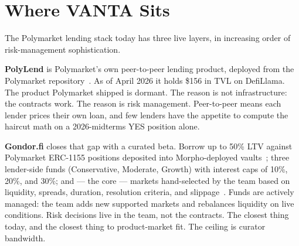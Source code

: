 \documentclass[11pt,letterpaper]{article}
\begin{document}
\begin{abstract}
We make four claims, in descending strength of evidence. First, the addressable market splits cleanly: a \emph{formalizable subset} of Polymarket (standard templates, whitelisted resolvers, $\geq 14$ days old) where curation reduces to gates plus bounded reasoning, and a \emph{hard subset} (novel templates, correlated baskets, custom resolvers) where human curation remains the correct tool. VANTA owns the formalizable subset; we explicitly defer the hard subset to lender-governance upgrades, not to the agent. Second, the resolution-aware haircut is a more honest pricing of tail risk than three buckets on the markets where its inputs are well-defined. Third, continuous agent reasoning --- not a periodic script over hard-coded gates --- is the correct shape for live risk: collateral prices, dispute behavior, and cluster correlations evolve between gate cycles, and the three loops respond to that evolution above the contract floor. Fourth, an attestation-liveness exit gives lenders a custody guarantee Gondor cannot offer: withdraw-only mode that activates without admin signatures if the enclave goes silent.

This paper specifies the engine, the onboarding rule set, the threat model, and the boundaries of the autonomy claim --- including the places where the framing overreaches and what we substitute instead.
\end{abstract}

\vspace{0.3cm}

\section{Where VANTA Sits}
\label{sec:ladder}

The Polymarket lending stack today has three live layers, in increasing order of risk-management sophistication.

\textbf{PolyLend} is Polymarket's own peer-to-peer lending product, deployed from the Polymarket repository~\cite{polylend}. As of April 2026 it holds \$156 in TVL on DefiLlama. The product Polymarket shipped is dormant. The reason is not infrastructure: the contracts work. The reason is risk management. Peer-to-peer means each lender prices their own loan, and few lenders have the appetite to compute the haircut math on a 2026-midterms YES position alone.

\textbf{Gondor.fi} closes that gap with a curated beta. Borrow up to 50\% LTV against Polymarket ERC-1155 positions deposited into Morpho-deployed vaults~\cite{morpho}; three lender-side funds (Conservative, Moderate, Growth) with interest caps of 10\%, 20\%, and 30\%; and --- the core --- markets hand-selected by the team based on liquidity, spreads, duration, resolution criteria, and slippage~\cite{gondor-docs}. Funds are actively managed: the team adds new supported markets and rebalances liquidity on live conditions. Risk decisions live in the team, not the contracts. The closest thing today, and the closest thing to product-market fit. The ceiling is curator bandwidth.
\end{document}
